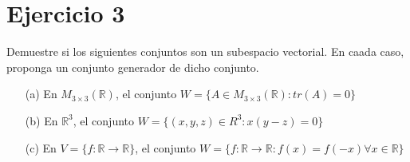 \section*{Ejercicio 3}
Demuestre si los siguientes conjuntos son un subespacio vectorial. En caada caso,
proponga un conjunto generador de dicho conjunto.

\begin{itemize}
    \item[(a)] En $M_{3\times 3} (\mathbb{R})$, el conjunto $W = \{ A \in M_{3\times 3} (\mathbb{R}) : tr(A) = 0 \}$
    \item[(b)] En $\mathbb{R}^{3}$, el conjunto $W = \{ (x, y, z) \in R^{3} : x(y - z) = 0 \}$
    \item[(c)] En $V = \{f : \mathbb{R} \rightarrow \mathbb{R}\}$, el conjunto $W = \{ f : \mathbb{R} \rightarrow \mathbb{R} : f(x) = f(-x) \forall x \in  \mathbb{R} \} $
\end{itemize}